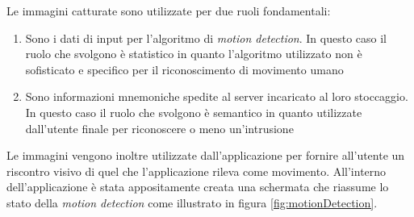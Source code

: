 \noindent Le immagini catturate sono utilizzate per due ruoli fondamentali:
\begin{enumerate}
  \item Sono i dati di input per l'algoritmo di \textit{motion detection}. In questo caso il ruolo che svolgono è statistico in quanto l'algoritmo utilizzato non è sofisticato e specifico per il riconoscimento di movimento umano
  \item Sono informazioni mnemoniche spedite al server incaricato al loro stoccaggio. In questo caso il ruolo che svolgono è semantico in quanto utilizzate dall'utente finale per riconoscere o meno un'intrusione
\end{enumerate}
\noindent Le immagini vengono inoltre utilizzate dall'applicazione per fornire all'utente un riscontro visivo di quel che l'applicazione rileva come movimento. All'interno dell'applicazione è stata appositamente creata una schermata che riassume lo stato della \textit{motion detection} come illustrato in figura \ref{fig:motionDetection}.
